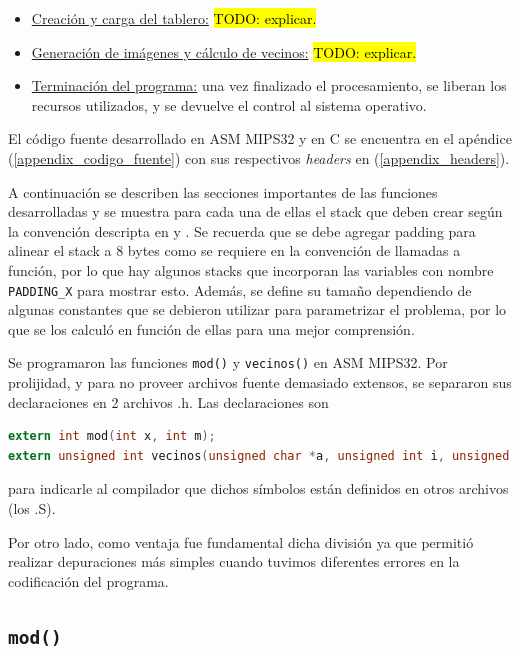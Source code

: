 \begin{itemize}
	\item \underline{Creación y carga del tablero:}
	\hl{TODO: explicar.}
	
	\item \underline{Generación de imágenes y cálculo de vecinos:}
	\hl{TODO: explicar.}
		
	\item \underline{Terminación del programa:} una vez finalizado el procesamiento, se liberan los recursos utilizados, y se devuelve el control al sistema operativo.
\end{itemize}

El código fuente desarrollado en ASM MIPS32 y en C se encuentra en el apéndice (\ref{appendix_codigo_fuente}) con sus respectivos \emph{headers} en (\ref{appendix_headers}).

A continuación se describen las secciones importantes de las funciones desarrolladas y se muestra para cada una de ellas el stack que deben crear según la convención descripta en \cite{abi} y \cite{abi_curso}. Se recuerda que se debe agregar padding para alinear el stack a 8 bytes como se requiere en la convención de llamadas a función, por lo que hay algunos stacks que incorporan las variables con nombre \texttt{PADDING\_X} para mostrar esto. Además, se define su tamaño dependiendo de algunas constantes que se debieron utilizar para parametrizar el problema, por lo que se los calculó en función de ellas para una mejor comprensión.

Se programaron las funciones \texttt{mod()} y \texttt{vecinos()} en ASM MIPS32. Por prolijidad, y para no proveer archivos fuente demasiado extensos, se separaron sus declaraciones en 2 archivos .h. Las declaraciones son
\begin{lstlisting}[language=C, style=StyleC]
extern int mod(int x, int m);
extern unsigned int vecinos(unsigned char *a, unsigned int i, unsigned int j, unsigned int M, unsigned int N);
\end{lstlisting}
para indicarle al compilador que dichos símbolos están definidos en otros archivos (los .S). 

Por otro lado, como ventaja fue fundamental dicha división ya que permitió realizar depuraciones más simples cuando tuvimos diferentes errores en la codificación del programa.

\subsection{\texttt{mod()}}

